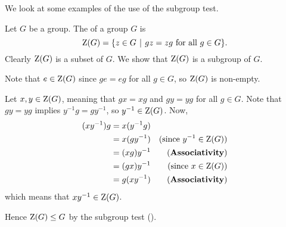 We look at some examples of the use of the subgroup test.
\begin{example}\label{example-center-of-group}
    Let $G$ be a group. The  of a group $G$ is
    \[
        \CenterGrp{G} = \{z \in G \vert gz = zg \text{ for all } g \in G\}.
    \]
    Clearly $\mathrm{Z}(G)$ is a subset of $G$. We show that $\mathrm{Z}(G)$ is a subgroup of $G$.

    Note that $e \in \mathrm{Z}(G)$ since $ge = eg$ for all $g \in G$, so $\mathrm{Z}(G)$ is non-empty.

    Let $x, y \in \mathrm{Z}(G)$, meaning that $gx = xg$ and $gy = yg$ for all $g \in G$. Note that $gy = yg$ implies $y^{-1}g = gy^{-1}$, so $y^{-1} \in \mathrm{Z}(G)$. Now,
    \begin{align*}
        (xy^{-1})g &= x(y^{-1}g)\\
        &= x(gy^{-1}) & (\text{since } y^{-1} \in \mathrm{Z}(G))\\
        &= (xg)y^{-1} & (\textbf{Associativity})\\
        &= (gx)y^{-1} & (\text{since } x \in \mathrm{Z}(G))\\
        &= g(xy^{-1}) & (\textbf{Associativity})
    \end{align*}
    which means that $xy^{-1} \in \mathrm{Z}(G)$.

    Hence $\mathrm{Z}(G) \leq G$ by the subgroup test ().
\end{example}

